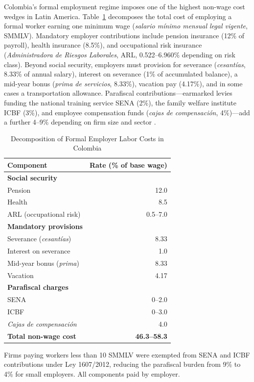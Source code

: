 \documentclass[5p,times,authoryear]{elsarticle}
\begin{document}
Colombia's formal employment regime imposes one of the highest non-wage cost wedges in Latin America. Table~\ref{tab:cost_decomposition} decomposes the total cost of employing a formal worker earning one minimum wage (\textit{salario m\'{i}nimo mensual legal vigente}, SMMLV). Mandatory employer contributions include pension insurance (12\% of payroll), health insurance (8.5\%), and occupational risk insurance (\textit{Administradora de Riesgos Laborales}, ARL, 0.522--6.960\% depending on risk class). Beyond social security, employers must provision for severance (\textit{cesant\'{i}as}, 8.33\% of annual salary), interest on severance (1\% of accumulated balance), a mid-year bonus (\textit{prima de servicios}, 8.33\%), vacation pay (4.17\%), and in some cases a transportation allowance. Parafiscal contributions---earmarked levies funding the national training service SENA (2\%), the family welfare institute ICBF (3\%), and employee compensation funds (\textit{cajas de compensaci\'{o}n}, 4\%)---add a further 4--9\% depending on firm size and sector \citep{anif2018}.

\begin{table}[htbp]
\centering
\begin{threeparttable}
\caption{Decomposition of Formal Employer Labor Costs in Colombia}
\label{tab:cost_decomposition}
\small
\setlength{\tabcolsep}{4pt}
\begin{tabular}{@{}lr@{}}
\toprule
Component & Rate (\% of base wage) \\
\midrule
\textbf{Social security} & \\
\quad Pension & 12.0 \\
\quad Health & 8.5 \\
\quad ARL (occupational risk) & 0.5--7.0 \\
\textbf{Mandatory provisions} & \\
\quad Severance (\textit{cesant\'{i}as}) & 8.33 \\
\quad Interest on severance & 1.0 \\
\quad Mid-year bonus (\textit{prima}) & 8.33 \\
\quad Vacation & 4.17 \\
\textbf{Parafiscal charges}\tnote{a} & \\
\quad SENA & 0--2.0 \\
\quad ICBF & 0--3.0 \\
\quad \textit{Cajas de compensaci\'{o}n} & 4.0 \\
\midrule
\textbf{Total non-wage cost} & \textbf{46.3--58.3} \\
\bottomrule
\end{tabular}
\begin{tablenotes}
\footnotesize
\item[a] Firms paying workers less than 10 SMMLV were exempted from SENA and ICBF contributions under Ley 1607/2012, reducing the parafiscal burden from 9\% to 4\% for small employers. All components paid by employer.
\end{tablenotes}
\end{threeparttable}
\end{table}
\end{document}
